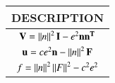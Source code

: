 \begin{tabular}[4pt]{|c|}
    \hline 
    \textbf{DESCRIPTION}\\
    \hline
    $\mathbf{V} = \left\lVert n\right\rVert^2\mathbf{I} - e^2\mathbf{nn^T}$ \\
    $\mathbf{u} = ce^2\mathbf{n} - \left\lVert n\right\rVert^2\mathbf{F}$ \\
    $f = \left\lVert n\right\rVert^2\left\lVert F\right\rVert^2 - c^2e^2 $ \\
    \hline
    
\end{tabular}
